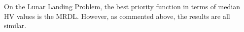 On the Lunar Landing Problem, the best priority function in terms of median HV values is the MRDL. However, as commented above, the results are all similar. 






